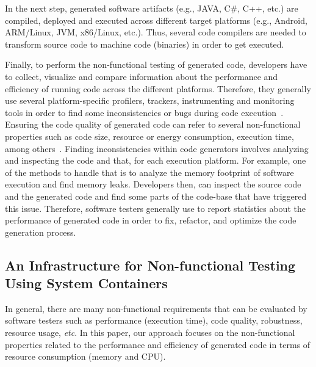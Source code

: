 In the next step, generated software artifacts (e.g., JAVA, C\#, C++, etc.) are compiled, deployed and executed across different target platforms (e.g., Android, ARM/Linux, JVM, x86/Linux, etc.). Thus, several code compilers are needed to transform source code to machine code (binaries) in order to get executed. 

Finally, to perform the non-functional testing of generated code, developers have to collect, visualize and compare information about the performance and efficiency of running code across the different platforms. 
Therefore, they generally use several platform-specific profilers, trackers, instrumenting and monitoring tools in order to find some inconsistencies or bugs during code execution~\cite{guana2014chaintracker,delgado2004taxonomy}. Ensuring the code quality of generated code can refer to several non-functional properties such as code size, resource or energy consumption, execution time, among others~\cite{pan2006fast}. Finding inconsistencies within code generators involves analyzing and inspecting the code and that, for each execution platform. For example, one of the methods to handle that is to analyze the memory footprint of software execution and find memory leaks. Developers then, can inspect the source code and the generated code and find some parts of the code-base that have triggered this issue. %
Therefore, software testers generally use to report statistics about the performance of generated code in order to fix, refactor, and optimize the code generation process.

\subsection{An Infrastructure for Non-functional Testing Using System Containers}
In general, there are many non-functional requirements that can be evaluated by software testers such as performance (execution time), code quality, robustness, resource usage, \textit{etc}. In this paper, our approach focuses on the non-functional properties related to the performance and efficiency of generated code in terms of resource consumption (memory and CPU).

